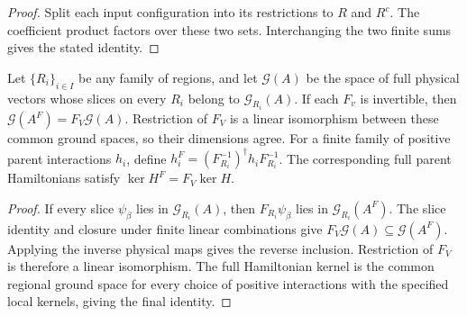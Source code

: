 \begin{proof}\leanok
    Split each input configuration into its restrictions to $R$ and
    $R^c$. The coefficient product factors over these two sets.
    Interchanging the two finite sums gives the stated identity.
\end{proof}

\begin{lemma}%
    \label{thm:peps_region_parent_ground_space_physical_transport}
    \leanok
    Let $\{R_i\}_{i\in I}$ be any family of regions, and let
    $\mathcal G(A)$ be the space of full physical vectors whose slices
    on every $R_i$ belong to $\mathcal G_{R_i}(A)$.
    If each $F_v$ is invertible, then
    $\mathcal G(A^F)=F_V\mathcal G(A)$.
    Restriction of $F_V$ is a linear isomorphism between these common
    ground spaces, so their dimensions agree.
    For a finite family of positive parent interactions $h_i$,
    define $h_i^F=(F_{R_i}^{-1})^\dagger h_iF_{R_i}^{-1}$.
    The corresponding full parent Hamiltonians satisfy
    $\ker H^F=F_V\ker H$.
\end{lemma}

\begin{proof}\leanok
    If every slice $\psi_\beta$ lies in $\mathcal G_{R_i}(A)$,
    then $F_{R_i}\psi_\beta$ lies in
    $\mathcal G_{R_i}(A^F)$. The slice identity and closure under
    finite linear combinations give $F_V\mathcal G(A)\subseteq
        \mathcal G(A^F)$. Applying the inverse physical maps gives the
    reverse inclusion. Restriction of $F_V$ is therefore a linear
    isomorphism. The full Hamiltonian kernel is the common regional
    ground space for every choice of positive interactions with the
    specified local kernels, giving the final identity.
\end{proof}
